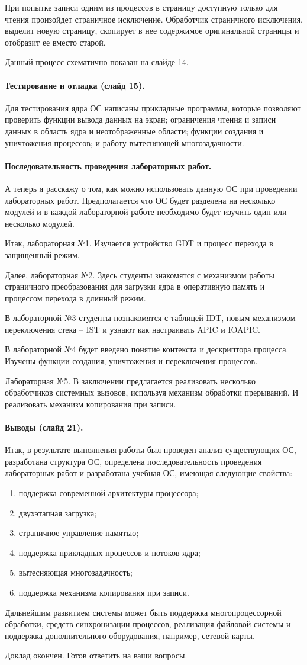 \documentclass[12pt]{article}
\begin{document}
При попытке записи одним из процессов в страницу доступную только для чтения произойдет страничное исключение.
Обработчик страничного исключения, выделит новую страницу, скопирует в нее содержимое оригинальной страницы
и отобразит ее вместо старой.

Данный процесс схематично показан на слайде 14.


\paragraph{Тестирование и отладка (слайд 15).}
Для тестирования ядра ОС написаны прикладные программы, которые позволяют проверить функции вывода данных на экран;
ограничения чтения и записи данных в область ядра и неотображенные области; функции создания и уничтожения процессов;
и работу вытесняющей многозадачности.


\paragraph{Последовательность проведения лабораторных работ.}
А теперь я расскажу о том, как можно использовать данную ОС при проведении лабораторных работ.
Предполагается что ОС будет разделена на несколько модулей и в каждой лабораторной работе необходимо
будет изучить один или несколько модулей.

Итак, лабораторная №1. Изучается устройство GDT и процесс перехода в защищенный режим.

Далее, лабораторная №2. Здесь студенты знакомятся с механизмом работы страничного преобразования для загрузки
ядра в оперативную память и процессом перехода в длинный режим.

В лабораторной №3 студенты познакомятся с таблицей IDT, новым механизмом переключения стека -- IST
и узнают как настраивать APIC и IOAPIC.

В лабораторной №4 будет введено понятие контекста и дескриптора процесса. Изучены функции создания,
уничтожения и переключения процессов.

Лабораторная №5. В заключении предлагается реализовать несколько обработчиков системных вызовов,
используя механизм обработки прерываний. И реализовать механизм копирования при записи.


\paragraph{Выводы (слайд 21).}
Итак, в результате выполнения работы был проведен анализ существующих ОС, разработана структура ОС,
определена последовательность проведения лабораторных работ и разработана учебная ОС, имеющая следующие свойства:
\begin{enumerate}
\item поддержка современной архитектуры процессора;
\item двухэтапная загрузка;
\item страничное управление памятью;
\item поддержка прикладных процессов и потоков ядра;
\item вытесняющая многозадачность;
\item поддержка механизма копирования при записи.
\end{enumerate}

Дальнейшим развитием системы может быть поддержка многопроцессорной обработки, средств синхронизации процессов,
реализация файловой системы и поддержка дополнительного оборудования, например, сетевой карты.

Доклад окончен. Готов ответить на ваши вопросы.
\end{document}
